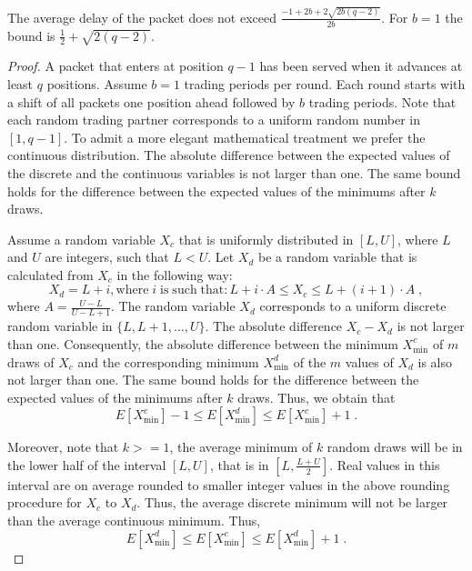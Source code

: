 \documentclass[letterpaper,10pt]{llncs}
\begin{document}
\begin{lemma}
\label{lem:delayUB}
The average delay of the packet does not exceed $\frac{-1+2 b+2 \sqrt{2b (q-2)}}{2 b}$. For $b=1$ the bound is $\frac{1}{2} + \sqrt{2(q-2)}$.
\end{lemma}
\begin{proof}
A packet that enters at position $q-1$ has been served when it advances 
at least $q$ positions. Assume $b=1$ trading periods per round.
Each round starts with a shift of all packets one position ahead followed by $b$ trading periods.
Note that each random trading partner corresponds to a uniform random number
in $[1,q-1]$. To admit a more elegant mathematical treatment we prefer the continuous 
distribution. The absolute difference between the expected values of the discrete and the continuous 
variables is not larger than one. The same bound holds for the difference between the 
expected values of the minimums after $k$ draws.

Assume a random variable $X_c$ that is uniformly distributed in $[L, U]$,
where $L$ and $U$ are integers, such that $L < U$. Let $X_d$ be a random variable
that is calculated from $X_c$ in the following way:
\[
X_d = L + i, \mathrm{ where } \; i \; \mathrm{is\;such\;that}: L + i \cdot A \leq X_c \leq L + (i+1) \cdot A \; ,
\]
where $A = \frac{U-L}{U-L+1}$. 
The random variable $X_d$ corresponds to a uniform discrete random variable in $\{L, L + 1, \dots, U\}$. The absolute difference $X_c - X_d$ is not larger than one.
Consequently, the absolute difference between the minimum $X_{\min}^c$ of $m$ draws of $X_c$ and the corresponding minimum $X_{\min}^d$ of the $m$ values of $X_d$ is also not larger than one. 
The same bound holds for the difference between the expected values of the minimums after $k$ draws.
Thus, we obtain that
\begin{equation}
\label{equ:AvgMaxDiscContOne}
E[X_{\min}^c] - 1 \leq E[X_{\min}^d] \leq E[X_{\min}^c] + 1 \; .
\end{equation}

\noindent
Moreover, note that $k >= 1$, the average minimum of $k$ random draws will be in the lower
half of the interval $[L,U]$, that is in $[L,\frac{L+U}{2}]$. Real values in this interval 
are on average rounded to smaller integer values in the above rounding procedure for $X_c$
to $X_d$. Thus, the average discrete minimum will not be larger than the average
continuous minimum. Thus,
\begin{equation}
\label{equ:AvgMaxDiscCont}
E[X_{\min}^d] \leq E[X_{\min}^c] \leq E[X_{\min}^d] + 1 \; .
\end{equation}


\end{proof}
\end{document}

